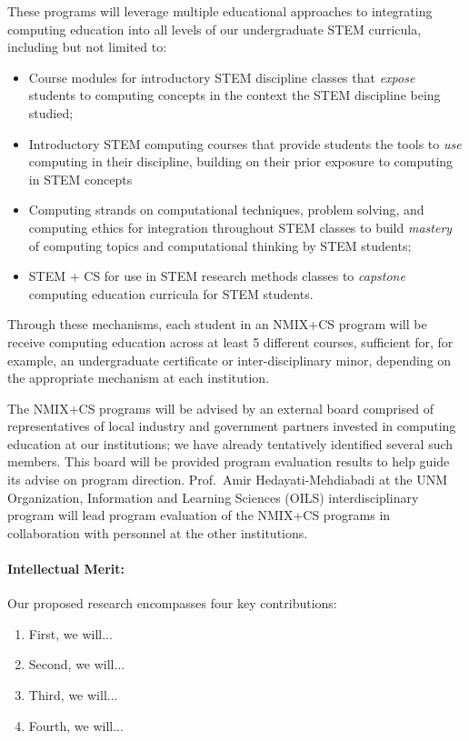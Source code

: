 These programs will leverage multiple educational approaches to integrating computing education into all levels of
our undergraduate STEM curricula, including but not limited to:
\begin{itemize}
\item Course modules for introductory STEM discipline classes that \emph{expose} students to computing concepts
  in the context the STEM discipline being studied;
\item Introductory STEM computing courses that provide students the tools to \emph{use} computing in their discipline,
  building on their prior exposure to computing in STEM concepts
\item Computing strands on computational techniques, problem solving, and computing ethics for integration
  throughout STEM classes to build \emph{mastery} of computing topics and computational thinking by STEM
  students;
\item STEM + CS for use in STEM research methods classes to \emph{capstone} computing education
  curricula for STEM students.
\end{itemize}
Through these mechanisms, each student in an NMIX+CS program will be receive computing education
across at least 5 different courses, sufficient for, for example, an undergraduate certificate or inter-disciplinary
minor, depending on the appropriate mechanism at each institution.

The NMIX+CS programs will be advised by an external board comprised of representatives of local industry and government partners
invested in computing education at our institutions; we have already tentatively identified several such members. This board will
be provided program evaluation results to help guide its advise on program direction.  Prof.~Amir Hedayati-Mehdiabadi at
the UNM Organization, Information and Learning Sciences (OILS) interdisciplinary program will lead program evaluation
of the NMIX+CS programs in collaboration with personnel at the other institutions.

\paragraph{Intellectual Merit:} Our proposed research encompasses four key contributions:
\begin{enumerate}
\item First, we will...
\item Second, we will...
\item Third, we will...
\item Fourth, we will...
\end{enumerate}

